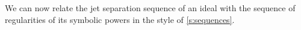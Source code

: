 \documentclass[12pt, reqno]{amsart}
\numberwithin{equation}{section}
\newcommand{\kk}{\mathbb{K}}
\DeclareMathOperator{\reg}{reg}
\theoremstyle{plain} %
\theoremstyle{definition}
\theoremstyle{remark}
\begin{document}
% 

We can now relate the jet separation sequence of an ideal with the sequence of regularities of its symbolic powers in the style of \cref{s:sequences}.
\end{document}
